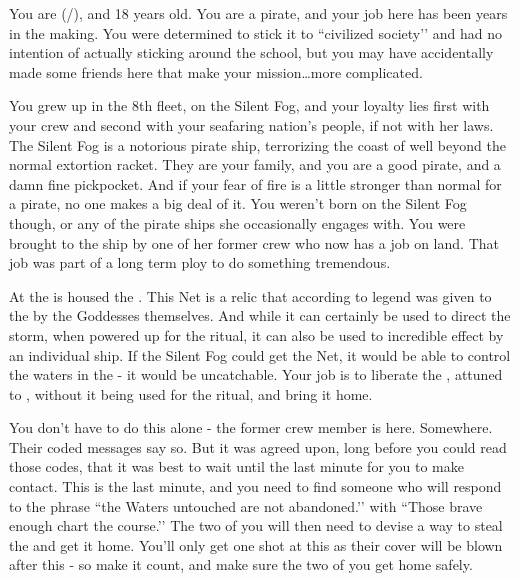 \documentclass[char]{GL2020}
\begin{document}
\name{\cPirateChild{}}


You are \cPirateChild{\full} (\cPirateChild{\they}/\cPirateChild{\them}), and 18 years old. You are a \pShip{} pirate, and your job here has been years in the making. You were determined to stick it to ``civilized society’’ and had no intention of actually sticking around the school, but you may have accidentally made some friends here that make your mission\ldots more complicated.

You grew up in the 8th fleet, on the Silent Fog, and your loyalty lies first with your crew and second with your seafaring nation’s people, if not with her laws. The Silent Fog is a notorious pirate ship, terrorizing the coast of \pFarm{} well beyond the normal extortion racket. They are your family, and you are a good pirate, and a damn fine pickpocket. And if your fear of fire is a little stronger than normal for a pirate, no one makes a big deal of it. You weren’t born on the Silent Fog though, or any of the pirate ships she occasionally engages with. You were brought to the ship by one of her former crew who now has a job on land. That job was part of a long term ploy to do something tremendous.

At the \pSchool{} is housed the \iNet{}. This Net is a relic that according to legend was given to the \pShip{} by the Goddesses themselves. And while it can certainly be used to direct the storm, when powered up for the ritual, it can also be used to incredible effect by an individual ship. If the Silent Fog could get the Net, it would be able to control the waters in the \pWod{} - it would be uncatchable. Your job is to liberate the \iNet{}, attuned to \pShip{}, without it being used for the ritual, and bring it home. 

You don’t have to do this alone - the former crew member is here. Somewhere. Their coded messages say so. But it was agreed upon, long before you could read those codes, that it was best to wait until the last minute for you to make contact. This is the last minute, and you need to find someone who will respond to the phrase ``the Waters untouched are not abandoned.’’ with ``Those brave enough chart the course.’’ The two of you will then need to devise a way to steal the \iNet{} and get it home. You’ll only get one shot at this as their cover will be blown after this - so make it count, and make sure the two of you get home safely.
\end{document}
